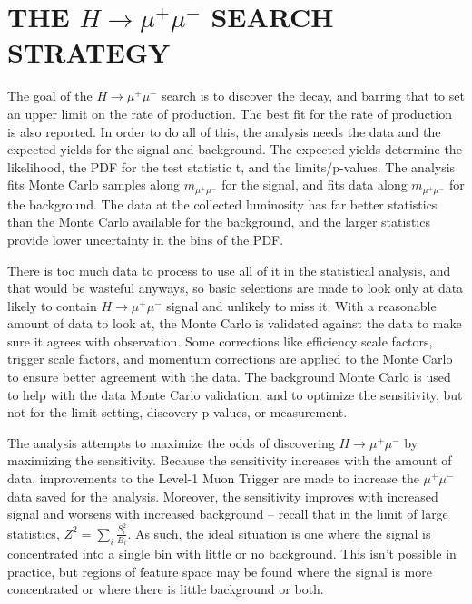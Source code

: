 \chapter{THE $H\rightarrow\mu^+\mu^-$ SEARCH STRATEGY} \label{strategy}

The goal of the $H\rightarrow\mu^+\mu^-$ search is to discover the decay, and barring that to set an upper limit on the rate of production. The best fit for the rate of production is also reported. In order to do all of this, the analysis needs the data and the expected yields for the signal and background. The expected yields determine the likelihood, the PDF for the test statistic t, and the limits/p-values. The analysis fits Monte Carlo samples along $m_{\mu^+\mu^-}$ for the signal, and fits data along $m_{\mu^+\mu^-}$ for the background. The data at the collected luminosity has far better statistics than the Monte Carlo available for the background, and the larger statistics provide lower uncertainty in the bins of the PDF. 

There is too much data to process to use all of it in the statistical analysis, and that would be wasteful anyways, so basic selections are made to look only at data likely to contain $H\rightarrow\mu^+\mu^-$ signal and unlikely to miss it. With a reasonable amount of data to look at, the Monte Carlo is validated against the data to make sure it agrees with observation. Some corrections like efficiency scale factors, trigger scale factors, and momentum corrections are applied to the Monte Carlo to ensure better agreement with the data. The background Monte Carlo is used to help with the data Monte Carlo validation, and to optimize the sensitivity, but not for the limit setting, discovery p-values, or measurement. 

The analysis attempts to maximize the odds of discovering $H\rightarrow\mu^+\mu^-$ by maximizing the sensitivity. Because the sensitivity increases with the amount of data, improvements to the Level-1 Muon Trigger are made to increase the $\mu^+\mu^-$ data saved for the analysis. Moreover, the sensitivity improves with increased signal and worsens with increased background -- recall that in the limit of large statistics, $Z^2=\sum_i\frac{S_i^2}{B_i}$. As such, the ideal situation is one where the signal is concentrated into a single bin with little or no background. This isn't possible in practice, but regions of feature space may be found where the signal is more concentrated or where there is little background or both. 

